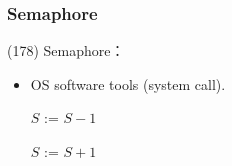 \subsubsection{Semaphore}

\begin{theorem}{(178)} Semaphore：\begin{itemize}
        \item OS software tools (system call).
        \begin{algorithm}[H]
            \caption{$wait(S)$ ($P(S)$).}
            \begin{algorithmic}[1]
                 
                    \EndWhile
                    \State $S$ := $S - 1$
                \EndFunction
            \end{algorithmic}
        \end{algorithm}
        \begin{algorithm}[H]
            \caption{$signal(S)$ ($V(S)$).}
            \begin{algorithmic}[1]
                 
                    \State $S$ := $S + 1$
                \EndFunction
            \end{algorithmic}
        \end{algorithm}
    \end{itemize}
\end{theorem}

